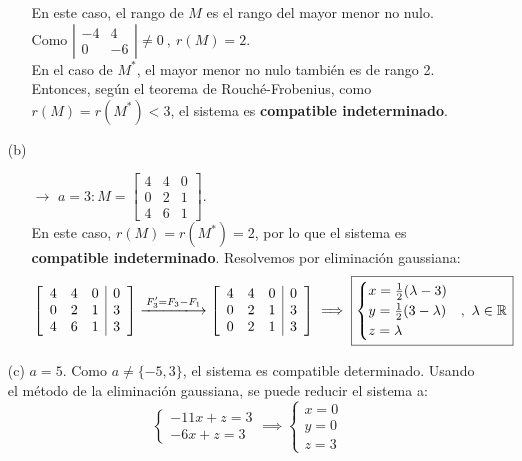 \begin{enumerate}
\begin{enumerate}
    En este caso, el rango de $M$ es el rango del mayor menor no nulo. \\
    
    Como $\left | \begin{array}{cc}
        -4 & 4 \\
        0 & -6
    \end{array} \right |\neq 0 \ , \ r(M)=2$. \\
    
    En el caso de $M^*$, el mayor menor no nulo también es de rango 2.
    Entonces, según el teorema de Rouché-Frobenius, como $r(M)= r(M^*)<3$, el sistema es \textbf{compatible indeterminado}.
    \end{enumerate}

    \item[(b)]
    \begin{enumerate}
        \item[$\rightarrow $] $a=3: M=\left [ \begin{array}{ccc}
         4 & 4     & 0  \\
          0    & 2 & 1  \\
          4    & 6    & 1 
    \end{array} \right ]$.\\
    
    En este caso, $r(M)=r(M^*)=2$, por lo que el sistema es \textbf{compatible indeterminado}. Resolvemos por eliminación gaussiana:
    $$
    \left [ \begin{array}{ccc|c}
         4 & 4     & 0&0  \\
          0    & 2 & 1  &3\\
          4    & 6    & 1 &3
    \end{array} \right ] \xlongrightarrow{F_3'=F_3-F_1} \left [ \begin{array}{ccc|c}
         4 & 4     & 0&0  \\
          0    & 2 & 1  &3\\
          0    & 2    & 1 &3
    \end{array} \right ] \implies \boxed{\begin{cases}
        x=\frac{1}{2}(\lambda -3)&\\
        y=\frac{1}{2}(3-\lambda )& ,\ \lambda \in \mathbb{R}\\
        z=\lambda 
    \end{cases}}
    $$
    \end{enumerate}

    \item[(c)] $a=5$. Como $a\neq \{ -5,3 \}$, el sistema es compatible determinado. Usando el método de la eliminación gaussiana, se puede reducir el sistema a:
    $$
    \begin{cases}
        -11x+z=3\\
        -6x+z=3
    \end{cases} \implies \boxed{\begin{cases}
        x=0\\
        y=0\\
        z=3
    \end{cases}}
    $$
\end{enumerate}
